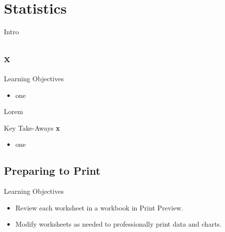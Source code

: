 \chapter{Statistics}\label{ch08:statistics}

Intro

\section{x}

\begin{center}
	\begin{objbox}{Learning Objectives}
		\begin{itemize}
			\setlength{\itemsep}{0pt}
			\setlength{\parskip}{0pt}
			\setlength{\parsep}{0pt}
			
			\item one

		\end{itemize}
	\end{objbox}
\end{center}

Lorem

\begin{center}
	\begin{tkwbox}{Key Take-Aways}
		\textbf{x}
		\\
		\begin{itemize}
			\setlength{\itemsep}{0pt}
			\setlength{\parskip}{0pt}
			\setlength{\parsep}{0pt}
			
			\item one
			
		\end{itemize}
	\end{tkwbox}
\end{center}

\section{Preparing to Print}

\begin{center}
	\begin{objbox}{Learning Objectives}
		\begin{itemize}
			\setlength{\itemsep}{0pt}
			\setlength{\parskip}{0pt}
			\setlength{\parsep}{0pt}
			
			\item Review each worksheet in a workbook in Print Preview.
			\item Modify worksheets as needed to professionally print data and charts.
			
		\end{itemize}
	\end{objbox}
\end{center}

